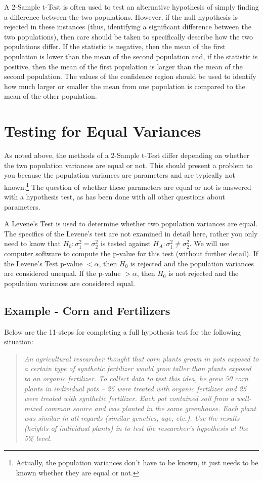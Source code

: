 \documentclass[10pt,openany]{book}\usepackage[]{graphicx}\usepackage[]{color}
\begin{document}
A 2-Sample t-Test is often used to test an alternative hypothesis of simply finding a difference between the two populations. However, if the null hypothesis is rejected in these instances (thus, identifying a significant difference between the two populations), then care should be taken to specifically describe how the two populations differ. If the statistic is negative, then the mean of the first population is lower than the mean of the second population and, if the statistic is positive, then the mean of the first population is larger than the mean of the second population. The values of the confidence region should be used to identify how much larger or smaller the mean from one population is compared to the mean of the other population.


\newpage
\section{Testing for Equal Variances}\label{sect:LevenesTest}
As noted above, the methods of a 2-Sample t-Test differ depending on whether the two population variances are equal or not. This should present a problem to you because the population variances are parameters and are typically not known.\footnote{Actually, the population variances don't have to be known, it just needs to be known whether they are equal or not.} The question of whether these parameters are equal or not is answered with a hypothesis test, as has been done with all other questions about parameters.

A Levene's Test is used to determine whether two population variances are equal. The specifics of the Levene's test are not examined in detail here, rather you only need to know that $H_{0}:\sigma_{1}^{2}=\sigma_{2}^{2}$ is tested against $H_{A}:\sigma_{1}^{2}\neq\sigma_{2}^{2}$. We will use computer software to compute the p-value for this test (without further detail). If the Levene's Test p-value $< \alpha$, then $H_{0}$ is rejected and the population variances are considered unequal. If the p-value $> \alpha$, then $H_{0}$ is not rejected and the population variances are considered equal.


\subsection{Example - Corn and Fertilizers}
Below are the 11-steps  for completing a full hypothesis test for the following situation:
\vspace{-4pt}
\begin{quote}
\textsl{An agricultural researcher thought that corn plants grown in pots exposed to a certain type of synthetic fertilizer would grow taller than plants exposed to an organic fertilizer. To collect data to test this idea, he grew 50 corn plants in individual pots -- 25 were treated with organic fertilizer and 25 were treated with synthetic fertilizer. Each pot contained soil from a well-mixed common source and was planted in the same greenhouse. Each plant was similar in all regards (similar genetics, age, etc.). Use the results (heights of individual plants) in  to test the researcher's hypothesis at the 5\% level.}
\end{quote}
\end{document}
